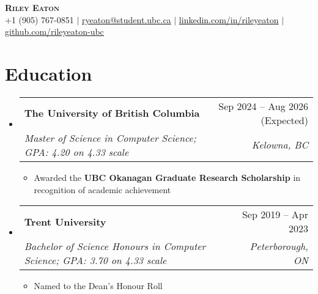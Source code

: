 \documentclass[letterpaper,10pt]{article}
\makeatletter
\newcommand{\resumeItem}[1]{
  \item\small{
    {#1 \vspace{-2pt}}
  }
}
\newcommand{\resumeSubheading}[4]{
  \vspace{-0.9pt}\item
    \begin{tabular*}{0.97\textwidth}[t]{l@{\extracolsep{\fill}}r}
      \textbf{\small#1} & \small#2 \\
      \textit{\small#3} & \textit{\small #4} \\
    \end{tabular*}\vspace{-7pt}
}
\newcommand{\resumeSubHeadingListStart}{\begin{itemize}[leftmargin=0.15in, label={}]}
\newcommand{\resumeSubHeadingListEnd}{\end{itemize}}
\newcommand{\resumeItemListStart}{\begin{itemize}}
\newcommand{\resumeItemListEnd}{\end{itemize}\vspace{-5pt}}
\def\iconSpace{0.5pt}
\makeatother
\begin{document}
\begin{center}
    \fontsize{18}{18}\textbf{\scshape Riley Eaton} \\ \vspace{2pt}
    \small \faPhoneSquare \hspace{\iconSpace} +1 (905) 767-0851
    $|$ \faEnvelope \hspace{\iconSpace} \underline{\href{mailto:ryeaton@student.ubc.ca}{ryeaton@student.ubc.ca}}
    $|$ \faLinkedinSquare \hspace{\iconSpace} \underline{\href{https://linkedin.com/in/rileyeaton}{linkedin.com/in/rileyeaton}}
    $|$ \faGithub \hspace{\iconSpace} \underline{\href{https://github.com/rileyeaton-ubc}{github.com/rileyeaton-ubc}}
\end{center}

\section{Education}
  \resumeSubHeadingListStart
    \resumeSubheading
      {The University of British Columbia}{Sep 2024 -- Aug 2026 (Expected)}
      {Master of Science in Computer Science; GPA: 4.20 on 4.33 scale}{Kelowna, BC}
      \resumeItemListStart
        \resumeItem{Awarded the \textbf{UBC Okanagan Graduate Research Scholarship} in recognition of academic achievement}
      \resumeItemListEnd
    \resumeSubheading
      {Trent University}{Sep 2019 -- Apr 2023}
      {Bachelor of Science Honours in Computer Science; GPA: 3.70 on 4.33 scale}{Peterborough, ON}
      \resumeItemListStart
        \resumeItem{Named to the Dean's Honour Roll}
      \resumeItemListEnd
  \resumeSubHeadingListEnd

\end{document}
